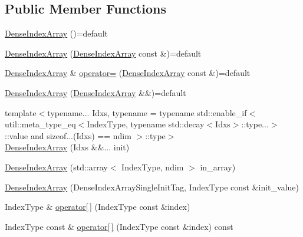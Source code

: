 \subsection*{Public Member Functions}
\begin{DoxyCompactItemize}
\item 
\hyperlink{structvt_1_1index_1_1_dense_index_array_afcd3d27f0c86b6c37540ae78f9afc2d1}{Dense\+Index\+Array} ()=default
\item 
\hyperlink{structvt_1_1index_1_1_dense_index_array_a835d59e4ac4c01436b7068c2fa05137b}{Dense\+Index\+Array} (\hyperlink{structvt_1_1index_1_1_dense_index_array}{Dense\+Index\+Array} const \&)=default
\item 
\hyperlink{structvt_1_1index_1_1_dense_index_array}{Dense\+Index\+Array} \& \hyperlink{structvt_1_1index_1_1_dense_index_array_a5f8e772873b44f670de731fe087e3a5a}{operator=} (\hyperlink{structvt_1_1index_1_1_dense_index_array}{Dense\+Index\+Array} const \&)=default
\item 
\hyperlink{structvt_1_1index_1_1_dense_index_array_a2a9e543ccf3fa97a217ad1c981911634}{Dense\+Index\+Array} (\hyperlink{structvt_1_1index_1_1_dense_index_array}{Dense\+Index\+Array} \&\&)=default
\item 
{\footnotesize template$<$typename... Idxs, typename  = typename std\+::enable\+\_\+if$<$      util\+::meta\+\_\+type\+\_\+eq$<$\+Index\+Type, typename std\+::decay$<$\+Idxs$>$\+::type...$>$\+::value and      sizeof...(\+Idxs) == ndim    $>$\+::type$>$ }\\\hyperlink{structvt_1_1index_1_1_dense_index_array_aa866f038df37f085bc6a48a57bcdaaa3}{Dense\+Index\+Array} (Idxs \&\&... init)
\item 
\hyperlink{structvt_1_1index_1_1_dense_index_array_a2d67c042ae2ac46fb32063ac63c994e8}{Dense\+Index\+Array} (std\+::array$<$ Index\+Type, ndim $>$ in\+\_\+array)
\item 
\hyperlink{structvt_1_1index_1_1_dense_index_array_aa53dfdb3cad352ad2d1d5701d5a4eb3f}{Dense\+Index\+Array} (Dense\+Index\+Array\+Single\+Init\+Tag, Index\+Type const \&init\+\_\+value)
\item 
Index\+Type \& \hyperlink{structvt_1_1index_1_1_dense_index_array_ab157c3c1d228b385f2c7be5f78634d93}{operator\mbox{[}$\,$\mbox{]}} (Index\+Type const \&index)
\item 
Index\+Type const  \& \hyperlink{structvt_1_1index_1_1_dense_index_array_ac46f5310e8a39ad248ab55b71d60eac0}{operator\mbox{[}$\,$\mbox{]}} (Index\+Type const \&index) const
\item 

\end{DoxyCompactItemize}
